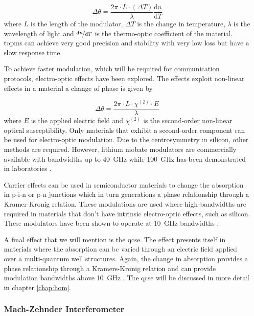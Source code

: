 \begin{equation}
	\Delta\theta = \frac{2\pi\cdot L\cdot (\Delta T)}{\lambda}\frac{\mathrm{d}n}{\mathrm{d}T}
\end{equation}
where $L$ is the length of the modulator, $\Delta T$ is the change in temperature, $\lambda$ is the wavelength of light and $\nicefrac{\mathrm{d}n}{\mathrm{d}T}$ is the thermo-optic coefficient of the material. \Acp{topm} can achieve very good precision and stability with very low loss but have a slow response time. 

To achieve faster modulation, which will be required for communication protocols, electro-optic effects have been explored. The effects exploit non-linear effects in a material a change of phase is given by

\begin{equation}
	\Delta\theta = \frac{2\pi\cdot L\cdot  \chi^{(2)}\cdot E}{\lambda}
\end{equation}
where $E$ is the applied electric field and $\chi^{(2)}$ is the second-order non-linear optical susceptibility. Only materials that exhibit a second-order component can be used for electro-optic modulation. Due to the centrosymmetry in silicon, other methods are required. However, lithium niobate modulators are commercially available with bandwidths up to \SI{40}{GHz} while \SI{100}{GHz} has been demonstrated in laboratories \cite{Louay2001Advances, Atsushi2010NRZ}.

Carrier effects can be used in semiconductor materials to change the absorption in p-i-n or p-n junctions which in turn generations a phase relationship through a Kramer-Kronig relation. These modulations are used where high-bandwidths are required in materials that don't have intrinsic electro-optic effects, such as silicon. These modulators have been shown to operate at \SI{10}{GHz} bandwidths \cite{Sibson2017Si}.

A final effect that we will mention is the \ac{qcse}. The effect presents itself in materials where the absorption can be varied through an electric field applied over a multi-quantum well structures. Again, the change in absorption provides a phase relationship through a Kramers-Kronig relation and can provide modulation bandwidths above \SI{10}{GHz} \cite{Sibson2017InP, semenenko2019integrated, semenenko2019mdi, semenenko2019, smit2014}. The \ac{qcse} will be discussed in more detail in chapter \ref{chap:hom}.

\subsubsection*{Mach-Zehnder Interferometer}

